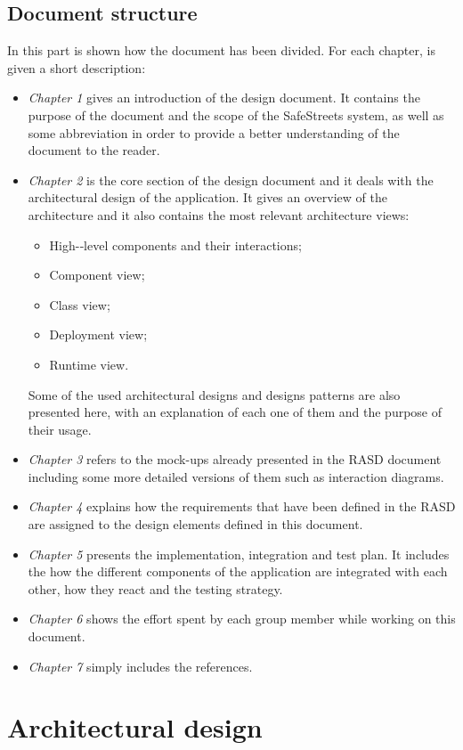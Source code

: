\documentclass{article}
\begin{document}
		\subsection{Document structure}
			In this part is shown how the document has been divided. For each chapter, is given a short description:
			\begin{itemize}
				\item \textit{Chapter 1} gives an introduction of the design document. It contains the purpose of the document and the scope of the SafeStreets system, as well as some abbreviation in order to provide a better understanding of the document to the reader.
				\item \textit{Chapter 2} is the core section of the design document and it deals with the architectural design of the application. It gives an overview of the architecture and it also contains the most relevant architecture views: 
				\begin{itemize}
					\item High-‐level components and their interactions;
					\item Component view;
					\item Class view;
					\item Deployment view;
					\item Runtime view. 
				\end{itemize}
			  	Some of the used architectural designs and designs patterns are also presented here, with an explanation of each one of them and the purpose of their usage.				
				\item \textit{Chapter 3} refers to the mock-ups already presented in the RASD document including some more detailed versions of them such as interaction diagrams.
				\item \textit{Chapter 4} explains how the requirements that have been deﬁned in the RASD are assigned to the design elements deﬁned in this document.
				\item \textit{Chapter 5} presents the implementation, integration and test plan. It includes the how the different components of the application are integrated with each other, how they react and the testing strategy.				
				\item \textit{Chapter 6}  shows the effort spent by each group member while working on this document.
				\item \textit{Chapter 7} simply includes the references.
			\end{itemize}
	\section{Architectural design}
\end{document}
